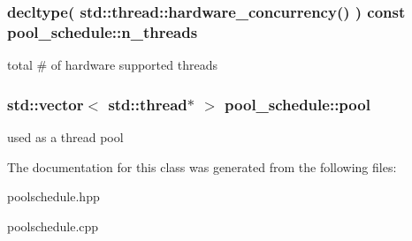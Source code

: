 \subsubsection[{n\+\_\+threads}]{\setlength{\rightskip}{0pt plus 5cm}decltype( std\+::thread\+::hardware\+\_\+concurrency() ) const pool\+\_\+schedule\+::n\+\_\+threads\hspace{0.3cm}{\ttfamily [protected]}}\label{classpool__schedule_adc11766f8ff9a29b21318bfcf81c815d}
total \# of hardware supported threads \hypertarget{classpool__schedule_ae13c48902fd23d0d8747978780731a04}{}
\subsubsection[{pool}]{\setlength{\rightskip}{0pt plus 5cm}std\+::vector$<$ std\+::thread$\ast$ $>$ pool\+\_\+schedule\+::pool\hspace{0.3cm}{\ttfamily [protected]}}\label{classpool__schedule_ae13c48902fd23d0d8747978780731a04}
used as a thread pool 

The documentation for this class was generated from the following files\+:\begin{DoxyCompactItemize}
\item 
poolschedule.\+hpp\item 
poolschedule.\+cpp\end{DoxyCompactItemize}
